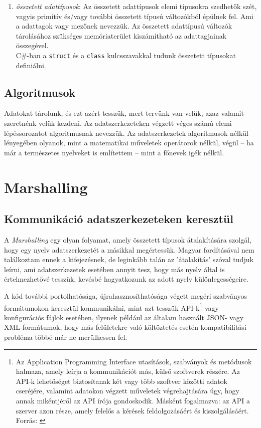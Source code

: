 \documentclass[tocnopagenum]{thesis-ekf}
\theoremstyle{definition}
\theoremstyle{remark}
\begin{document}
\begin{enumerate}[label=\alph*)]
\begin{enumerate}
\begin{tabular}{cc}
			\end{tabular}
		\end{enumerate}
		\item \emph{összetett adattípusok}: Az összetett adattípusok elemi típusokra szedhetők szét, vagyis primitív és/vagy további összetett típusú változókból épülnek fel. Ami a adattagok vagy mezőnek nevezzük. Az összetett adattípusú változók tárolásához szükséges memóriaterület kiszámítható az adattagjainak összegével.\\
		C\#-ban a \verb*|struct| és a \verb*|class| kulcsszavakkal tudunk összetett típusokat definiálni.
	\end{enumerate}
	
	\section{Algoritmusok}
	Adatokat tárolunk, és ezt azért tesszük, mert tervünk van velük, azaz valamit szeretnénk velük kezdeni. Az adatszerkezeteken végzett véges számú elemi lépéssorozatot algoritmusnak nevezzük. Az adatszerkezetek algoritmusok nélkül lényegében olyanok, mint a matematikai műveletek operátorok nélkül, végül -- ha már a természetes nyelveket is említettem -- mint a főnevek igék nélkül.
	
	\chapter{Marshalling}
	\section{Kommunikáció adatszerkezeteken keresztül}
	A \emph{Marshalling} egy olyan folyamat, amely összetett típusok átalakítására szolgál, hogy egy nyelv adatszerkezetét a másikkal megértessük. Magyar fordításával nem találkoztam ennek a kifejezésnek, de leginkább talán az 'átalakítás' szóval tudjuk leírni, ami adatszerkezetek esetében annyit tesz, hogy más nyelv által is értelmezhetővé tesszük, kevésbé hagyatkozunk az adott nyelv különlegességeire.\cite{sof_marshalling}
	\par
	A kód további portolhatósága, újrahasznosíthatósága végett megéri szabványos formátumokon keresztül kommunikálni, mint azt tesszük API-k\footnote{Az Application Programming Interface utasítások, szabványok és metódusok halmaza, amely leírja a kommunikációt más, külső szoftverek részére. Az API-k lehetőséget biztosítanak két vagy több szoftver közötti adatok cseréjére, valamint adatokon végzett műveletek végrehajtására úgy, hogy annak mikéntjéről az API írója gondoskodik. Másként fogalmazva: az API a szerver azon része, amely felelős a kérések feldolgozásáért és kiszolgálásáért. Forrás: \cite{api}} vagy konfigurációs fájlok esetében, ilyenek például az általam használt JSON- vagy XML-formátumok,  hogy más felületekre való költöztetés esetén kompatibilitási probléma többé már ne merülhessen fel.
	
\end{document}
